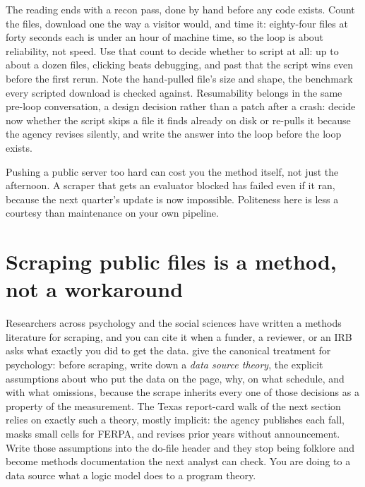 The reading ends with a recon pass, done by hand before any code exists. Count the files, download one the way a visitor would, and time it: eighty-four files at forty seconds each is under an hour of machine time, so the loop is about reliability, not speed. Use that count to decide whether to script at all: up to about a dozen files, clicking beats debugging, and past that the script wins even before the first rerun. Note the hand-pulled file's size and shape, the benchmark every scripted download is checked against. Resumability belongs in the same pre-loop conversation, a design decision rather than a patch after a crash: decide now whether the script skips a file it finds already on disk or re-pulls it because the agency revises silently, and write the answer into the loop before the loop exists.

Pushing a public server too hard can cost you the method itself, not just the afternoon. A scraper that gets an evaluator blocked has failed even if it ran, because the next quarter's update is now impossible. Politeness here is less a courtesy than maintenance on your own pipeline.

\section{Scraping public files is a method, not a workaround}\label{sec:ch04-scrapelit}
Researchers across psychology and the social sciences have written a methods literature for scraping, and you can cite it when a funder, a reviewer, or an IRB asks what exactly you did to get the data. \textcite{landers2016scraping} give the canonical treatment for psychology: before scraping, write down a \emph{data source theory}, the explicit assumptions about who put the data on the page, why, on what schedule, and with what omissions, because the scrape inherits every one of those decisions as a property of the measurement. The Texas report-card walk of the next section relies on exactly such a theory, mostly implicit: the agency publishes each fall, masks small cells for FERPA, and revises prior years without announcement. Write those assumptions into the do-file header and they stop being folklore and become methods documentation the next analyst can check. You are doing to a data source what a logic model does to a program theory.

